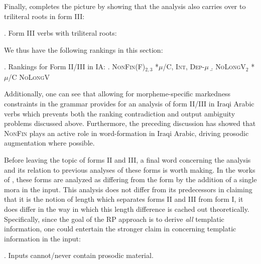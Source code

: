\documentclass[12pt,twoside,letterpaper]{article}
\begin{document}
Finally, \Next completes the picture by showing that the analysis also carries over to triliteral roots in form III:

\ex. Form III verbs with triliteral roots:\\\begin{OTtableau}{3}
\end{OTtableau}

We thus have the following rankings in this section:

\pagebreak

\ex. Rankings for Form II/III in IA:
\a. \textsc{NonFin}(F)$_{2,3}$ \OTdom \textsc{*$\mu$/C}, \textsc{Int}, \textsc{Dep}-$\mu$
\b. \textsc{NoLongV}$_2$ \OTdom \textsc{*$\mu$/C} \OTdom \textsc{NoLongV}

Additionally, one can see that allowing for morpheme-specific markedness constraints in the grammar provides for an analysis of form II/III in Iraqi Arabic verbs which prevents both the ranking contradiction and output ambiguity problems discussed above. Furthermore, the preceding discussion has showed that \textsc{NonFin} plays an active role in word-formation in Iraqi Arabic, driving prosodic augmentation where possible. 

Before leaving the topic of forms II and III, a final word concerning the analysis and its relation to previous analyses of these forms is worth making. In the works of \cite{mccarthy90,moore90,ussishkin00}, these forms are analyzed as differing from the {\em {}} form by the addition of a single mora in the input. This analysis does not differ from its predecessors in claiming that it is the notion of length which separates forms II and III from form I, it does differ in the way in which this length difference is cached out theoretically. Specifically, since the goal of the RP approach is to derive \emph{all} templatic information, one could entertain the stronger claim in \Next concerning templatic information in the input:

\ex. Inputs cannot/never contain prosodic material.
\end{document}
